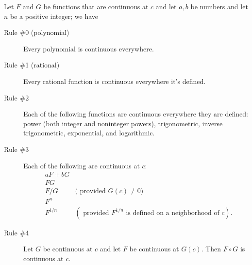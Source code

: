 \documentclass[12pt,fleqn,answers]{exam}
\begin{document}




\noindent Let $F$ and $G$ be functions that are continuous at $c$ and let
 $a,b$ be numbers and let $n$ be a positive integer; we have 
\begin{description}

\item[Rule \#0 (polynomial)] Every polynomial is continuous everywhere.

\item[Rule \#1 (rational)] Every rational function is continuous everywhere it's defined.

\item[Rule \#2]  Each of the following functions are continuous everywhere they
are defined: power (both integer and noninteger powers), trigonometric, inverse trigonometric, exponential, and logarithmic.

\item[Rule \#3] Each of the following are continuous at $c$:
\begin{align*}
    &a F + b G \\
    &F G & \\
    &F/G & (\mbox{ provided  $G(c) \neq 0$) }\\
    &F^n & \\
    &F^{1/n} & (\mbox{ provided $F^{1/n}$ is defined on a neighborhood of $c$}).
\end{align*}

\item[Rule \#4] Let $G$ be continuous at $c$ and let $F$ be continuous at $G(c)$.
Then $F \circ G$ is continuous at $c$.
\end{description}
\end{document}
